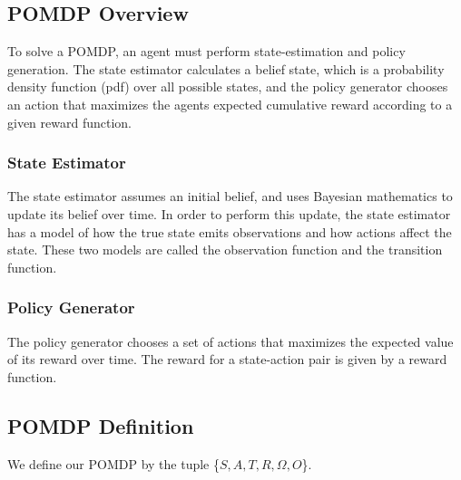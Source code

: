 \documentclass[letterpaper]{article}
\newcommand{\stnote}[1]{\textcolor{blue}{\textbf{ST: #1}}}
\begin{document}

\subsection{POMDP Overview}

To solve a POMDP, an agent must perform state-estimation and policy generation. The state estimator calculates a belief state, which is a probability density function (pdf) over all possible states, and the policy generator chooses an action that maximizes the agents expected cumulative reward according to a given reward function. 

\subsubsection{State Estimator}
The state estimator assumes an initial belief, and uses Bayesian mathematics to update its belief over time. In order to perform this update, the state estimator has a model of how the true state emits observations and how actions affect the state. These two models are called the observation function and the transition function.


\subsubsection{Policy Generator}
The policy generator chooses a set of actions that maximizes the expected value of its reward over time. The reward for a state-action pair is given by a reward function.  

\subsection{POMDP Definition}
We define our POMDP by the tuple \{$S, A, T, R, \Omega, O$\}.
\end{document}
